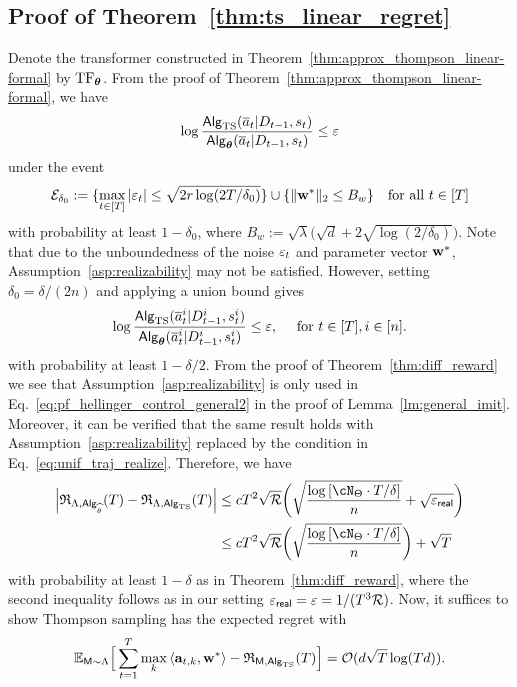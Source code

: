 \subsection{Proof of Theorem~\ref{thm:ts_linear_regret}}\label{sec:pf_prop:ts_linear_regret}
Denote the transformer constructed in Theorem~\ref{thm:approx_thompson_linear-formal} by ${\rm TF}_{{\boldsymbol \theta}}$. 
From the proof of Theorem~\ref{thm:approx_thompson_linear-formal}, we have 
$$\log\frac{{\mathsf{Alg}}_{{\mathrm{TS}}}({\overline{a}}_t|{D}_{t-1},{s}_t)}{{\mathsf{Alg}}_{{{\boldsymbol \theta}}}({\overline{a}}_t|{D}_{t-1},{s}_t)}\leq \varepsilon$$ under the event $${\mathcal E}_{\delta_0}:=\{\max_{t\in[T]}|\varepsilon_t|\leq\sqrt{2{r}\log(2T/\delta_0)}\}\cup \{\|{\mathbf w}^*\|_2\leq  B_w\}~~\text{ for all } t\in[{T}]$$ with probability at least $1-\delta_0$, where  $B_w:=\sqrt{\lambda}\big(\sqrt{d}+2\sqrt{\log(2/\delta_0)}\big)$. Note that due to the unboundedness of the noise $\varepsilon_t$ and parameter vector ${\mathbf w}^*$, Assumption~\ref{asp:realizability} may not be satisfied. However, setting $\delta_0=\delta/(2n)$ and applying a union bound gives 
\begin{align}
    \log\frac{{\mathsf{Alg}}_{{\mathrm{TS}}}({\overline{a}}^i_t|{D}^i_{t-1},{s}^i_t)}{{\mathsf{Alg}}_{{{\boldsymbol \theta}}}({\overline{a}}^i_t|{D}^i_{t-1},{s}^i_t)}\leq \varepsilon,~~~\text{ for } t\in[{T}],i\in[n].\label{eq:unif_traj_realize}
\end{align} 
with probability at least $1-\delta/2$. 
From the proof of Theorem~\ref{thm:diff_reward} we see that Assumption~\ref{asp:realizability} is only used in Eq.~\eqref{eq:pf_hellinger_control_general2} in the proof of Lemma~\ref{lm:general_imit}. Moreover, it can be verified that the same result holds with  Assumption~\ref{asp:realizability}  replaced by the condition in Eq.~\eqref{eq:unif_traj_realize}. Therefore, we have \begin{align*}
\Big|\totreward_{\prior,\sAlg_\EstPar}(\totlen)-\totreward_{\prior,\sAlg_\TS}(\totlen)\Big|
&\leq 
c \totlen^2 \sqrt{\distratio} \bigg(\sqrt{\frac{\log \brac{ \cN_{\Parspace} \cdot 
 \totlen/\delta } }{n}} +  \sqrt{\geneps}\bigg)\\
 &\leq 
 c \totlen^2 \sqrt{\distratio} \bigg(\sqrt{\frac{\log \brac{ \cN_{\Parspace} \cdot 
 \totlen/\delta } }{n}}  \bigg)+\sqrt{\totlen}
\end{align*}
with probability at least $1-\delta$ as in Theorem~\ref{thm:diff_reward}, where the second inequality follows as in our setting ${\varepsilon}_{\sf real}=\varepsilon=1/({T}^3{\mathcal{R}})$. 
Now, it suffices to show Thompson sampling has the expected regret with 
\begin{align*}
    \mathbb{E}_{{\mathsf{M}}\sim{\Lambda}}\Big[\sum_{t=1}^{T}\max_{k}\left\langle{\mathbf a}_{t,k},{\mathbf w}^*\right\rangle-{\mathfrak{R}}_{{\mathsf{M}},{\mathsf{Alg}}_{\mathrm{TS}}}({T})\Big]=\mathcal{O}(d\sqrt{T}\log(Td)). 
\end{align*}





